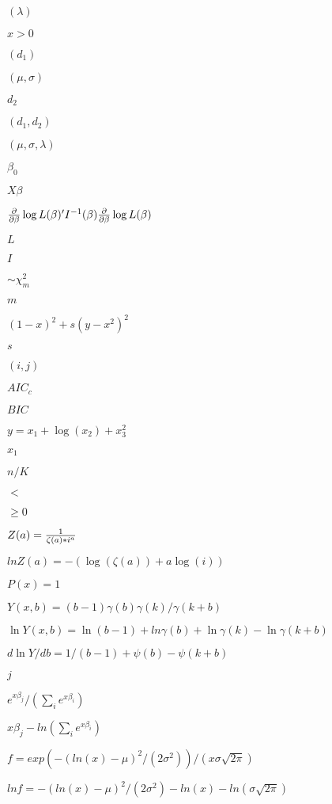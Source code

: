 \documentclass{article}
\begin{document}
$(\lambda)$
\pagebreak

$x>0$
\pagebreak

$(d_1)$
\pagebreak

$(\mu, \sigma)$
\pagebreak

$d_2$
\pagebreak

$(d_1, d_2)$
\pagebreak

$(\mu, \sigma, \lambda)$
\pagebreak

$\beta_0$
\pagebreak

$X\beta$
\pagebreak

${\partial\over \partial\beta}\log L(\beta)'I^{-1}(\beta){\partial\over \partial\beta}\log L(\beta)$
\pagebreak

$L$
\pagebreak

$I$
\pagebreak

$\sim \chi^2_m$
\pagebreak

$m$
\pagebreak

$(1-x)^2+ s(y - x^2)^2$
\pagebreak

$s$
\pagebreak

$(i,j)$
\pagebreak

$AIC_c$
\pagebreak

$BIC$
\pagebreak

$y = x_1 + \log(x_2) + x_3^2$
\pagebreak

$x_1$
\pagebreak

$n/K$
\pagebreak

$<$
\pagebreak

$\geq 0$
\pagebreak

$Z(a) = {1\over \zeta(a) * i^a} $
\pagebreak

$lnZ(a) = -(\log(\zeta(a)) + a \log(i)) $
\pagebreak

$P(x) = 1$
\pagebreak

$ Y(x, b) = (b-1) \gamma(b) \gamma(k) / \gamma(k+b) $
\pagebreak

$ \ln Y(x, b) = \ln(b-1) + ln\gamma(b) + \ln\gamma(k) - \ln\gamma(k+b) $
\pagebreak

$ d\ln Y/db = 1/(b-1) + \psi(b) - \psi(k+b) $
\pagebreak

$j$
\pagebreak

$e^{x\beta_j}/ (\sum_i{e^{x\beta_i}})$
\pagebreak

$x\beta_j - ln(\sum_i{e^{x\beta_i}})$
\pagebreak

$f = exp(-(ln(x)-\mu)^2/(2\sigma^2))/ (x\sigma\sqrt{2\pi})$
\pagebreak

$ln f = -(ln(x)-\mu)^2/(2\sigma^2) - ln(x) - ln(\sigma\sqrt{2\pi})$
\pagebreak
\end{document}
